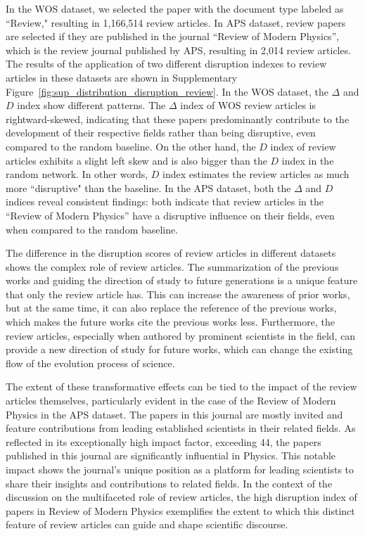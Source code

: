 \documentclass[12pt]{article}
\begin{document}
\begin{refsection}
In the WOS dataset, we selected the paper with the document type labeled as ``Review," resulting in 1,166,514 review articles. In APS dataset, review papers are selected if they are published in the journal ``Review of Modern Physics'', which is the review journal published by APS, resulting in 2,014 review articles. The results of the application of two different disruption indexes to review articles in these datasets are shown in Supplementary Figure~\ref{fig:sup_distribution_disruption_review}. In the WOS dataset, the $\Delta$ and $D$ index show different patterns. The $\Delta$ index of WOS review articles is rightward-skewed, indicating that these papers predominantly contribute to the development of their respective fields rather than being disruptive, even compared to the random baseline. On the other hand, the $D$ index of review articles exhibits a slight left skew and is also bigger than the $D$ index in the random network. In other words, $D$ index estimates the review articles as much more ``disruptive" than the baseline. In the APS dataset, both the $\Delta$ and $D$ indices reveal consistent findings: both indicate that review articles in the ``Review of Modern Physics'' have a disruptive influence on their fields, even when compared to the random baseline. 

The difference in the disruption scores of review articles in different datasets shows the complex role of review articles. The summarization of the previous works and guiding the direction of study to future generations is a unique feature that only the review article has. This can increase the awareness of prior works, but at the same time, it can also replace the reference of the previous works, which makes the future works cite the previous works less. Furthermore, the review articles, especially when authored by prominent scientists in the field, can provide a new direction of study for future works, which can change the existing flow of the evolution process of science. 

The extent of these transformative effects can be tied to the impact of the review articles themselves, particularly evident in the case of the Review of Modern Physics in the APS dataset. The papers in this journal are mostly invited and feature contributions from leading established scientists in their related fields. As reflected in its exceptionally high impact factor, exceeding 44, the papers published in this journal are significantly influential in Physics. This notable impact shows the journal’s unique position as a platform for leading scientists to share their insights and contributions to related fields. In the context of the discussion on the multifaceted role of review articles, the high disruption index of papers in Review of Modern Physics exemplifies the extent to which this distinct feature of review articles can guide and shape scientific discourse.


\end{refsection}
\end{document}
